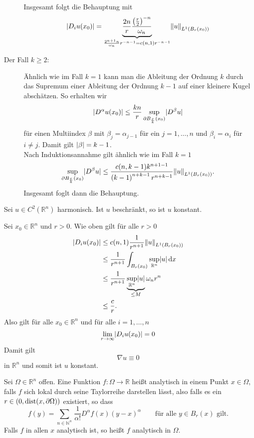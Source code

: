 \begin{beweis}
\begin{description}
		Insgesamt folgt die Behauptung mit
		\begin{equation}
			\abs{D_iu(x_0)}
			 = \underset{\frac{2^{n+1}n}{\omega_n}r^{-n-1}= c(n,1)r^{-n-1}}{\underbrace{\frac{2n}{r} \frac{\left( \frac{r}{2} \right)^{-n}}{\omega_n}}} \norm{u}_{L^1(B_r(x_0))}
		\end{equation}
		\item[Der Fall $k \geq 2$:]Ähnlich wie im Fall $k=1$ kann man die Ableitung der Ordnung $k$ durch das Supremum einer Ableitung der Ordnung $k-1$ auf einer
		kleinere Kugel abschätzen.
		So erhalten wir
		\[
			\lvert D^{\alpha}u(x_0)\rvert \leq  \frac{kn}{r} \sup_{\partial B_{\frac{r}{k}}(x_0)} \lvert D^{\beta}u\rvert
		\]
		für einen Multiindex $\beta$ mit $\beta_j = \alpha_{j-1}$ für ein $j=1,\dots,n$ und $\beta_i = \alpha_i$ für $i \neq j$. Damit gilt $\lvert\beta\rvert= k-1$. \\
		Nach Induktionsannahme gilt ähnlich wie im Fall $k=1$
		\begin{equation}
			\sup_{\partial B_{\frac{r}{k}}(x_0)} \abs{D^{\beta}u} \leq \frac{c(n,k-1)k^{n+1-1}}{\left( k-1 \right)^{n+k-1}r^{n+k-1}} \norm{u}_{L^1(B_r(x_0))}.
		\end{equation}
		Insgesamt foglt dann die Behauptung.
	\end{description}
\end{beweis}

\begin{satz}
	Sei $u \in C^2(\mathbb{R}^n)$ harmonisch. Ist $u$ beschränkt, so ist $u$ konstant.
\end{satz}
\begin{beweis}
	Sei $x_0 \in \mathbb{R}^n$ und $r >0$. Wie oben gilt für alle $r > 0$
	\begin{align*}
		\abs{D_iu(x_0)} &\leq c(n,1) \frac{1}{r^{n+1}} \norm{u}_{L^1(B_r(x_0))} \\
		& \leq \frac{1}{r^{n+1}} \int_{B_r(x_0)}^{} \sup_{\mathbb{R}^n} \abs{u} \,\mathrm{d}x \\
		&\leq \frac{1}{r^{n+1}}\, \underset{\leq M}{\underbrace{\sup_{\mathbb{R}^n}\abs{u}}} \,\omega_n r^n \\
		&\leq \frac{c}{r}.
	\end{align*}
	Also gilt für alle $x_0 \in \mathbb{R}^n$ und für alle $i=1,\dots,n$
	\[
		\lim_{r \to \infty}\lvert D_iu(x_0)\rvert = 0
	\]
	Damit gilt 
	\[
		 \nabla u \equiv 0 
	\]
	in $\mathbb{R}^n$ und somit ist $u$ konstant.
\end{beweis}

\begin{definition}
	Sei $\Omega \in \mathbb{R}^n$ offen. Eine Funktion $f : \Omega \to \mathbb{R}$ heißt analytisch in einem Punkt $x \in \Omega$, 
	falls $f$ sich lokal durch seine Taylorreihe darstellen lässt, also falls es ein $r \in (0, \operatorname{dist}(x,\partial \Omega))$ existiert, so dass
	\begin{equation}
		f(y) = \sum_{n \in \mathbb{N}^n}^{} \frac{}{} \frac{1}{\alpha !}D^{\alpha}f(x)(y-x)^{\alpha} \qquad \text{für alle }y \in B_r(x) \text{ gilt.}
	\end{equation}
	Falls $f$ in allen $x$ analytisch ist, so heißt $f$ analytisch in $\Omega$.
\end{definition}

